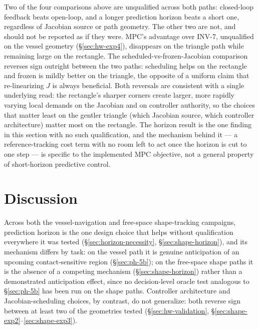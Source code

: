 \documentclass[journal]{IEEEtran}
\begin{document}
Two of the four comparisons above are unqualified across both paths:
closed-loop feedback beats open-loop, and a longer prediction horizon
beats a short one, regardless of Jacobian source or path geometry. The
other two are not, and should not be reported as if they were. MPC's
advantage over INV-7, unqualified on the vessel geometry
(\S\ref{sec:hw-exp4}), disappears on the triangle path while remaining
large on the rectangle. The scheduled-vs-frozen-Jacobian comparison
reverses sign outright between the two paths: scheduling helps on the
rectangle and frozen is mildly better on the triangle, the opposite of a
uniform claim that re-linearizing $J$ is always beneficial. Both
reversals are consistent with a single underlying read: the rectangle's
sharper corners create larger, more rapidly varying local demands on the
Jacobian and on controller authority, so the choices that matter least
on the gentler triangle (which Jacobian source, which controller
architecture) matter most on the rectangle. The horizon result is the one
finding in this section with no such qualification, and the mechanism
behind it --- a reference-tracking cost term with no room left to act
once the horizon is cut to one step --- is specific to the implemented
MPC objective, not a general property of short-horizon predictive
control.


\section{Discussion}
\label{sec:discussion}
Across both the vessel-navigation and free-space shape-tracking
campaigns, prediction horizon is the one design choice that helps
without qualification everywhere it was tested
(\S\ref{sec:horizon-necessity}, \S\ref{sec:shape-horizon}), and its
mechanism differs by task: on the vessel path it is genuine anticipation
of an upcoming contact-sensitive region (\S\ref{sec:ph-5b}); on the
free-space shape paths it is the absence of a competing mechanism
(\S\ref{sec:shape-horizon}) rather than a demonstrated anticipation
effect, since no decision-level oracle test analogous to
\S\ref{sec:ph-5b} has been run on the shape paths. Controller
architecture and Jacobian-scheduling choices, by contrast, do not
generalize: both reverse sign between at least two of the geometries
tested (\S\ref{sec:hw-validation}, \S\ref{sec:shape-exp2}--\ref{sec:shape-exp3}).
\end{document}
